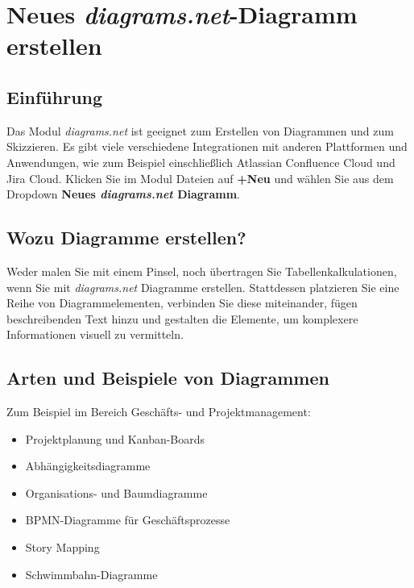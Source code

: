 \documentclass[
  letterpaper,
  DIV=11,
  numbers=noendperiod]{scrreprt}
\providecommand{\tightlist}{%
  \setlength{\itemsep}{0pt}\setlength{\parskip}{0pt}}\usepackage{longtable,booktabs,array}
\begin{document}
\section{\texorpdfstring{Neues \emph{diagrams.net}-Diagramm
erstellen}{Neues diagrams.net-Diagramm erstellen}}\label{neues-diagrams.net-diagramm-erstellen}

\subsection{Einführung}\label{einfuxfchrung}

Das Modul \emph{diagrams.net} ist geeignet zum Erstellen von Diagrammen
und zum Skizzieren. Es gibt viele verschiedene Integrationen mit anderen
Plattformen und Anwendungen, wie zum Beispiel einschließlich Atlassian
Confluence Cloud und Jira Cloud. Klicken Sie im Modul Dateien auf
\textbf{+Neu} und wählen Sie aus dem Dropdown \textbf{Neues
\emph{diagrams.net} Diagramm}.

\subsection{Wozu Diagramme erstellen?}\label{wozu-diagramme-erstellen}

Weder malen Sie mit einem Pinsel, noch übertragen Sie
Tabellenkalkulationen, wenn Sie mit \emph{diagrams.net} Diagramme
erstellen. Stattdessen platzieren Sie eine Reihe von Diagrammelementen,
verbinden Sie diese miteinander, fügen beschreibenden Text hinzu und
gestalten die Elemente, um komplexere Informationen visuell zu
vermitteln.

\subsection{Arten und Beispiele von
Diagrammen}\label{arten-und-beispiele-von-diagrammen}

Zum Beispiel im Bereich Geschäfts- und Projektmanagement:

\begin{itemize}
\tightlist
\item
  Projektplanung und Kanban-Boards
\item
  Abhängigkeitsdiagramme
\item
  Organisations- und Baumdiagramme
\item
  BPMN-Diagramme für Geschäftsprozesse
\item
  Story Mapping
\item
  Schwimmbahn-Diagramme
\end{itemize}
\end{document}
